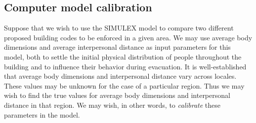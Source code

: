 \documentclass{article}
\begin{document}

\subsection{Computer model calibration} \label{computer_model_calibration}

Suppose that we wish to use the SIMULEX model to compare two different proposed building codes to be enforced in a given area. We may use average body dimensions and average interpersonal distance as input parameters for this model, both to settle the initial physical distribution of people throughout the building and to influence their behavior during evacuation. It is well-established that average body dimensions \citep{Subramanian2011,Cavelaars2000} %
and interpersonal distance \citep{Sorokowska2017} vary across locales. These values may be unknown for the case of a particular region. Thus we may wish to find the true values for average body dimensions and interpersonal distance in that region. We may wish, in other words, to \textit{calibrate} these parameters in the model.
\end{document}

